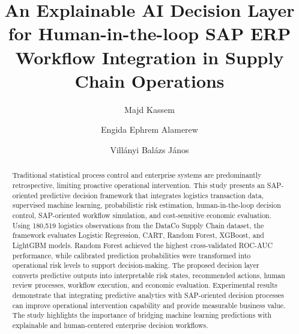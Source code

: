 \documentclass[manuscript, screen, review]{acmart}
\begin{document}
\title{An Explainable AI Decision Layer for Human-in-the-loop SAP ERP Workflow Integration in Supply Chain Operations}

\author{Majd Kassem}

\author{Engida Ephrem Alamerew}

\author{Villányi Balázs János}


\renewcommand{\shortauthors}{Surname, et al.}

\begin{abstract}
Traditional statistical process control and enterprise systems are predominantly retrospective, limiting proactive operational intervention. This study presents an SAP-oriented predictive decision framework that integrates logistics transaction data, supervised machine learning, probabilistic risk estimation, human-in-the-loop decision control, SAP-oriented workflow simulation, and cost-sensitive economic evaluation. Using 180,519 logistics observations from the DataCo Supply Chain dataset, the framework evaluates Logistic Regression, CART, Random Forest, XGBoost, and LightGBM models. Random Forest achieved the highest cross-validated ROC-AUC performance, while calibrated prediction probabilities were transformed into operational risk levels to support decision-making. The proposed decision layer converts predictive outputs into interpretable risk states, recommended actions, human review processes, workflow execution, and economic evaluation. Experimental results demonstrate that integrating predictive analytics with SAP-oriented decision processes can improve operational intervention capability and provide measurable business value. The study highlights the importance of bridging machine learning predictions with explainable and human-centered enterprise decision workflows.
\end{abstract}
\end{document}
